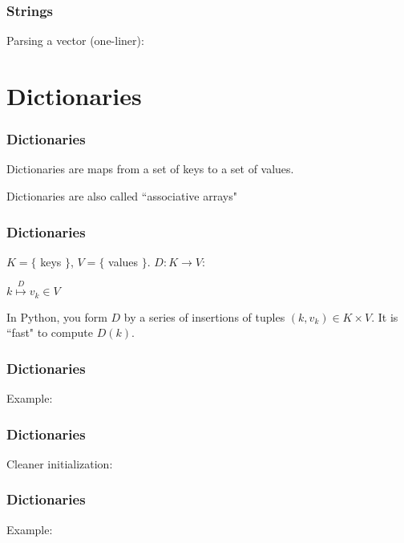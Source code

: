 \documentclass{beamer}
\begin{document}
\begin{frame}
\frametitle{Strings}
Parsing a vector (one-liner):

\end{frame}


\section{Dictionaries}

\begin{frame}
\frametitle{Dictionaries}

Dictionaries are maps from a set of keys to a set of values.

\vspace{0.2in}

Dictionaries are also called ``associative arrays"
\end{frame}


\begin{frame}
\frametitle{Dictionaries}

$K = \{$ keys $\}$, $V = \{$ values $\}$.  $D: K \rightarrow V$:

\huge{
\begin{center}
$k \stackrel{D}{\longmapsto} v_k \in V$
\end{center}
} \normalsize{}

\vspace{0.2in}

In Python, you form $D$ by a series of insertions of tuples $(k, v_k) \in K \times V$.  It is ``fast" to compute $D(k)$.

\end{frame}

\begin{frame}
\frametitle{Dictionaries}

Example:


\end{frame}


\begin{frame}
\frametitle{Dictionaries}

Cleaner initialization:


\end{frame}

\begin{frame}
\frametitle{Dictionaries}

Example:


\end{frame}
\end{document}
